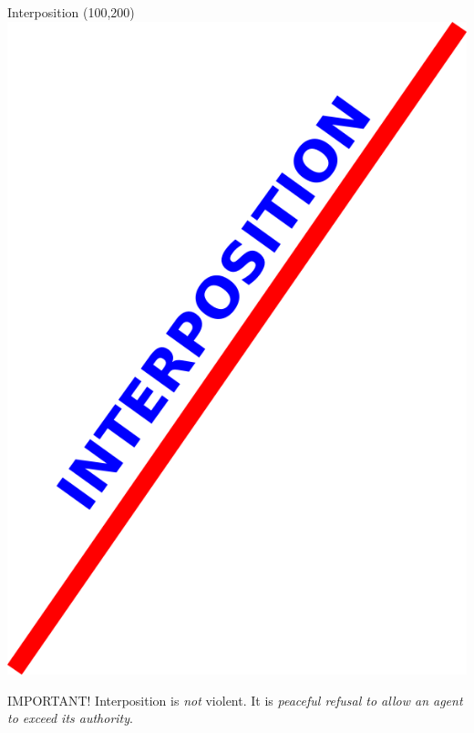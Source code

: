 \begin{frame}{Interposition}
    \Put(100,200){\includegraphics[height=0.8\textheight]{img/line.png}}
\end{frame}

\begin{frame}
    \begin{block}{IMPORTANT!}
        { \huge Interposition is \emph{not} violent. It is \emph{peaceful refusal to allow an agent to exceed its authority}.}
    \end{block}
\end{frame}

